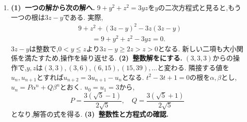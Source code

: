 \begin{enumerate}[label=\textbf{問\arabic*.},leftmargin=3.8em,format=\bookitemlink{practice-entrance}{solution}{problem}]
\[\begin{aligned}
                    a_m\mid a_n&\ \Longleftrightarrow\ a_r=0\\
                      &\ \Longleftrightarrow\ r=0\ \Longleftrightarrow\ m\mid n.
                    \end{aligned}
                  \]
                  $m=1$でも$r=0$なので成り立つ.(1)は$a_3=5$を用いた$m=3$の場合に当たる.
                  \smallskip\textbf{(3)~項から添字の互除法へ.}
                  $a_n-a_r$は$a_m$の倍数なので,共通の約数は変わらず,
                  \[
                    \gcd(a_m,a_n)=\gcd(a_m,a_r).
                  \]
                  \[
                    \gcd(a_m,a_n)=\gcd(a_d,a_0)=a_d.
                  \]
                  最後は$a_0=0$と$\gcd(x,0)=x$を使った.
                  例では$3040=2026+1014$, $2026=1014+1012$, $1014=1012+2$, $1012=506\cdot2$より$d=2$である.
                  したがって$\gcd(a_{2026},a_{3040})=a_2=2$となる.
                  巨大な項どうしの整除関係を,小さな添字の計算へ移せた.
          \item \textbf{(1)~一つの解から次の解へ.}
                  $9+y^2+z^2=3yz$を$y$の二次方程式と見ると,もう一つの根は$3z-y$である.
                  実際,
                  \[
                    \begin{aligned}
                    &9+z^2+(3z-y)^2-3z(3z-y)\\
                    &\qquad=9+y^2+z^2-3yz=0.
                    \end{aligned}
                  \]
                  $3z-y$は整数で,$0<y\le z$より$3z-y\ge2z>z>0$となる.
                  新しい二項も大小関係を満たすため,操作を繰り返せる.
                  \smallskip\textbf{(2)~整数解をにする.}
                  $(3,3,3)$からの操作で,$y,z$は$(3,3),(3,6),(6,15),(15,39),\ldots$と変わる.
                  隣接する値を$u_n,u_{n+1}$とすれば$u_{n+2}=3u_{n+1}-u_n$となる.
                  $t^2-3t+1=0$の根を$\alpha,\beta$とし,
                  $u_n=P\alpha^n+Q\beta^n$とおく.
                  $u_0=u_1=3$から,
                  \[
                    P=\frac{3(\sqrt5-1)}{2\sqrt5},\quad
                    Q=\frac{3(\sqrt5+1)}{2\sqrt5}
                  \]
                  となり,解答の式を得る.
                  \smallskip\textbf{(3)~整数性と方程式の確認.}

\end{enumerate}
